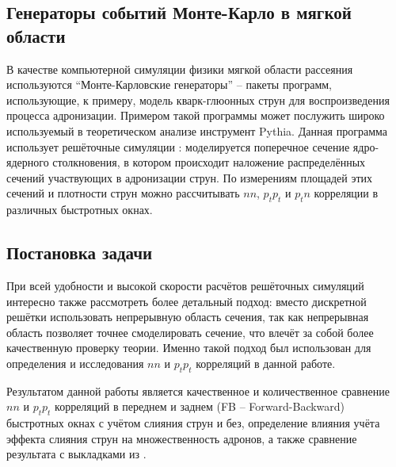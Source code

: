 \subsection{Генераторы событий Монте-Карло в мягкой области}
В качестве компьютерной симуляции физики мягкой области рассеяния используются ``Монте-Карловские генераторы'' \cite{MonteCarlo1,MonteCarlo2} -- пакеты программ, использующие, к примеру, модель кварк-глюонных струн для воспроизведения процесса адронизации. Примером такой программы может послужить широко используемый в теоретическом анализе инструмент Pythia. Данная программа использует решёточные симуляции \cite{TransLattice1,TransLattice2}: моделируется поперечное сечение ядро-ядерного столкновения, в котором происходит наложение распределённых сечений участвующих в адронизации струн. По измерениям площадей этих сечений и плотности струн можно рассчитывать $nn$, $p_t p_t$ и $p_t n$ корреляции в различных быстротных окнах.
\subsection{Постановка задачи}
При всей удобности и высокой скорости расчётов решёточных симуляций интересно также рассмотреть более детальный подход: вместо дискретной решётки использовать непрерывную область сечения, так как непрерывная область позволяет точнее смоделировать сечение, что влечёт за собой более качественную проверку теории. Именно такой подход был использован для определения и исследования $nn$ и $p_tp_t$ корреляций в данной работе. 

Результатом данной работы является качественное и количественное сравнение $nn$ и $p_tp_t$ корреляций в переднем и заднем (FB -- Forward-Backward) быстротных окнах с учётом слияния струн и без, определение влияния учёта эффекта слияния струн на множественность адронов, а также сравнение результата с выкладками из \cite{bStatement}.
